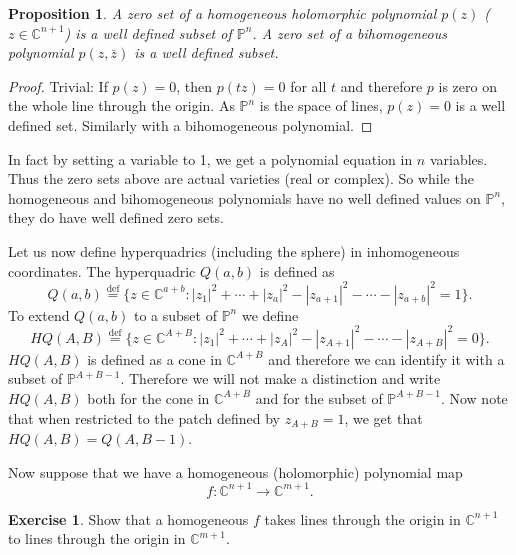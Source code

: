\documentclass[12pt,openany]{book}
\newcommand{\abs}[1]{\left\lvert {#1} \right\rvert}
\newcommand{\C}{{\mathbb{C}}}
\newcommand{\bP}{{\mathbb{P}}}
\theoremstyle{plain}
\newtheorem{prop}[thm]{Proposition}
\theoremstyle{remark}
\theoremstyle{definition}
\theoremstyle{exercise}
\newtheorem{exercise}{Exercise}[section]
\theoremstyle{example}
\begin{document}
\begin{prop}
A zero set of a homogeneous holomorphic polynomial $p(z)$ ($z \in \C^{n+1}$)
is a well defined subset of $\bP^n$.  A zero set of a bihomogeneous polynomial
$p(z,\bar{z})$ is a well defined subset.
\end{prop}

\begin{proof}
Trivial: If $p(z) = 0$, then $p(tz) = 0$ for all $t$ and therefore $p$ is
zero on the whole line through the origin.  As $\bP^n$ is the space of lines,
$p(z) = 0$ is a well defined set.  Similarly with a bihomogeneous polynomial.
\end{proof}

In fact by setting a variable to 1, we get a polynomial equation in $n$
variables.  Thus the zero sets above are actual varieties (real or complex).
So while the homogeneous and bihomogeneous polynomials have no well defined
values on $\bP^n$, they do have well defined zero sets.

Let us now define hyperquadrics (including the sphere) in inhomogeneous
coordinates.  The hyperquadric $Q(a,b)$ is defined as
\begin{equation}
Q(a,b) \overset{\text{def}}{=} \{ z \in \C^{a+b} :
\abs{z_1}^2 + \cdots + \abs{z_a}^2
- \abs{z_{a+1}}^2 - \cdots - \abs{z_{a+b}}^2 = 1
\} .
\end{equation}
To extend $Q(a,b)$ to a subset of $\bP^n$ we define
\begin{equation}
HQ(A,B) \overset{\text{def}}{=} \{ z \in \C^{A+B} :
\abs{z_1}^2 + \cdots + \abs{z_A}^2
- \abs{z_{A+1}}^2 - \cdots - \abs{z_{A+B}}^2 = 0
\} .
\end{equation}
$HQ(A,B)$ is defined as a cone in $\C^{A+B}$ and therefore
we can identify it with a subset of $\bP^{A+B-1}$.
Therefore we will not make a distinction and write $HQ(A,B)$
both for the cone in $\C^{A+B}$ and for the subset of $\bP^{A+B-1}$.
Now note that when restricted to the patch defined by $z_{A+B} = 1$, we get
that $HQ(A,B) = Q(A,B-1)$.

Now suppose that we have a homogeneous (holomorphic) polynomial map
\begin{equation}
f \colon \C^{n+1} \to \C^{m+1} .
\end{equation}

\begin{exercise}
Show that a homogeneous $f$ takes lines through the origin in $\C^{n+1}$ to
lines through the origin in $\C^{m+1}$.
\end{exercise}
\end{document}
